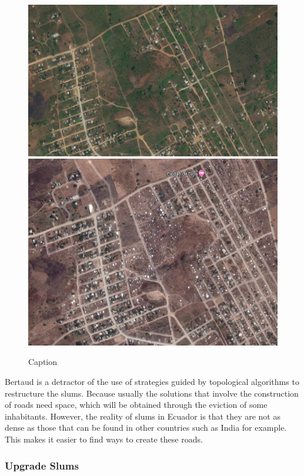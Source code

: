 \documentclass[10pt]{article}
\begin{document}
\begin{figure}[h]
    \centering
    \includegraphics[scale = 0.31]{images/slum2010}
    \includegraphics[scale = 0.22]{images/slum2019}
    \caption{Caption}
    \label{fig:my_label}
\end{figure}

Bertaud is a detractor of the use of strategies guided by topological algorithms to restructure the slums. Because usually the solutions that involve the construction of roads need space, which will be obtained through the eviction of some inhabitants\cite{Ornes9686}. However, the reality of slums in Ecuador is that they are not as dense as those that can be found in other countries such as India for example. This makes it easier to find ways to create these roads. 

\subsubsection{Upgrade Slums}
\end{document}
